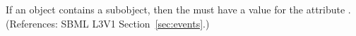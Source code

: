 If an \Event object contains a \Delay subobject, then the \Event must have
a value for the attribute .  (References:
SBML L3V1 Section~\ref{sec:events}.)
